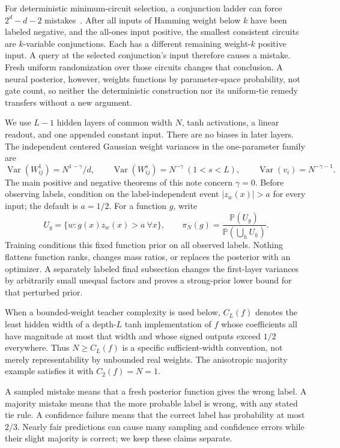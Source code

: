 \documentclass[11pt]{article}
\begin{document}
For deterministic minimum-circuit selection, a conjunction ladder can
force $2^d-d-2$ mistakes~\cite{occam}. After all inputs of Hamming weight
below $k$ have been labeled negative, and the all-ones input positive,
the smallest consistent circuits are $k$-variable conjunctions. Each
has a different remaining weight-$k$ positive input. A query at the
selected conjunction's input therefore causes a mistake. Fresh uniform
randomization over those circuits changes that conclusion. A neural
posterior, however, weights functions by parameter-space probability,
not gate count, so neither the deterministic construction nor its
uniform-tie remedy transfers without a new argument.

We use $L-1$ hidden layers of common width $N$, tanh activations, a
linear readout, and one appended constant input. There are no biases
in later layers. The independent centered Gaussian weight variances
in the one-parameter family are
\begin{equation}\label{eq:model-gamma}
 \operatorname{Var}(W^1_{ij})=N^{1-\gamma}/d,\qquad
 \operatorname{Var}(W^s_{ij})=N^{-\gamma}\ (1<s<L),\qquad
 \operatorname{Var}(v_i)=N^{-\gamma-1}.
\end{equation}
The main positive and negative theorems of this note concern
$\gamma=0$. Before observing labels, condition on the label-independent
event $|z_w(x)|>a$ for every input; the default is $a=1/2$.
For a function $g$, write
\[
 U_g=\{w:g(x)z_w(x)>a\ \forall x\},\qquad
 \pi_N(g)=\frac{\mathbb P(U_g)}{\mathbb P(\bigcup_hU_h)}.
\]
Training conditions this fixed function prior on all observed labels.
Nothing flattens function ranks, changes mass ratios, or replaces the
posterior with an optimizer. A separately labeled final subsection
changes the first-layer variances by arbitrarily small unequal factors
and proves a strong-prior lower bound for that perturbed prior.

When a bounded-weight teacher complexity is used below, $C_L(f)$
denotes the least hidden width of a depth-$L$ tanh implementation of
$f$ whose coefficients all have magnitude at most that width and whose
signed outputs exceed $1/2$ everywhere. Thus $N\ge C_L(f)$ is a
specific sufficient-width convention, not merely representability by
unbounded real weights. The anisotropic majority example satisfies it
with $C_2(f)=N=1$.

A sampled mistake means that a fresh posterior function gives the
wrong label. A majority mistake means that the more probable label is
wrong, with any stated tie rule. A confidence failure means that the
correct label has probability at most $2/3$. Nearly fair predictions
can cause many sampling and confidence errors while their slight
majority is correct; we keep these claims separate.
\end{document}
